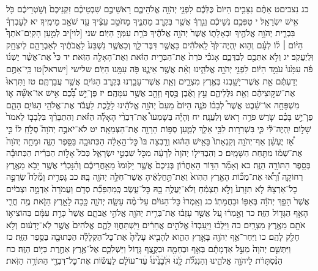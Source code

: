 \documentclass[twoside, openany, parskip=half, 11pt]{book}
\begin{document}
כג נִצביםט אַתֶּ֨ם נִצָּבִ֤ים הַיּוֹם֙ כֻּלְּכֶ֔ם לִפְנֵ֖י יְהֹוָ֣ה אֱלֹהֵיכֶ֑ם רָאשֵׁיכֶ֣ם שִׁבְטֵיכֶ֗ם זִקְנֵיכֶם֙ וְשֹׁ֣טְרֵיכֶ֔ם כֹּ֖ל אִ֥ישׁ יִשְׂרָאֵֽל׃ י טַפְּכֶ֣ם נְשֵׁיכֶ֔ם וְגֵ֣רְךָ֔ אֲשֶׁ֖ר בְּקֶ֣רֶב מַחֲנֶ֑יךָ מֵחֹטֵ֣ב עֵצֶ֔יךָ עַ֖ד שֹׁאֵ֥ב מֵימֶֽיךָ׃ יא לְעׇבְרְךָ֗ בִּבְרִ֛ית יְהֹוָ֥ה אֱלֹהֶ֖יךָ וּבְאָלָת֑וֹ אֲשֶׁר֙ יְהֹוָ֣ה אֱלֹהֶ֔יךָ כֹּרֵ֥ת עִמְּךָ֖ הַיּֽוֹם׃ שני [לוי]יב לְמַ֣עַן הָקִֽים־אֹתְךָ֩ הַיּ֨וֹם ׀ ל֜וֹ לְעָ֗ם וְה֤וּא יִֽהְיֶה־לְּךָ֙ לֵֽאלֹהִ֔ים כַּאֲשֶׁ֖ר דִּבֶּר־לָ֑ךְ וְכַאֲשֶׁ֤ר נִשְׁבַּע֙ לַאֲבֹתֶ֔יךָ לְאַבְרָהָ֥ם לְיִצְחָ֖ק וּֽלְיַעֲקֹֽב׃ יג וְלֹ֥א אִתְּכֶ֖ם לְבַדְּכֶ֑ם אָנֹכִ֗י כֹּרֵת֙ אֶת־הַבְּרִ֣ית הַזֹּ֔את וְאֶת־הָאָלָ֖ה הַזֹּֽאת׃ יד כִּי֩ אֶת־אֲשֶׁ֨ר יֶשְׁנ֜וֹ פֹּ֗ה עִמָּ֙נוּ֙ עֹמֵ֣ד הַיּ֔וֹם לִפְנֵ֖י יְהֹוָ֣ה אֱלֹהֵ֑ינוּ וְאֵ֨ת אֲשֶׁ֥ר אֵינֶ֛נּוּ פֹּ֖ה עִמָּ֥נוּ הַיּֽוֹם׃ שלישי [ישראל]טו כִּֽי־אַתֶּ֣ם יְדַעְתֶּ֔ם אֵ֥ת אֲשֶׁר־יָשַׁ֖בְנוּ בְּאֶ֣רֶץ מִצְרָ֑יִם וְאֵ֧ת אֲשֶׁר־עָבַ֛רְנוּ בְּקֶ֥רֶב הַגּוֹיִ֖ם אֲשֶׁ֥ר עֲבַרְתֶּֽם׃ טז וַתִּרְאוּ֙ אֶת־שִׁקּ֣וּצֵיהֶ֔ם וְאֵ֖ת גִּלֻּלֵיהֶ֑ם עֵ֣ץ וָאֶ֔בֶן כֶּ֥סֶף וְזָהָ֖ב אֲשֶׁ֥ר עִמָּהֶֽם׃ יז פֶּן־יֵ֣שׁ בָּ֠כֶ֠ם אִ֣ישׁ אוֹ־אִשָּׁ֞ה א֧וֹ מִשְׁפָּחָ֣ה אוֹ־שֵׁ֗בֶט אֲשֶׁר֩ לְבָב֨וֹ פֹנֶ֤ה הַיּוֹם֙ מֵעִם֙ יְהֹוָ֣ה אֱלֹהֵ֔ינוּ לָלֶ֣כֶת לַעֲבֹ֔ד אֶת־אֱלֹהֵ֖י הַגּוֹיִ֣ם הָהֵ֑ם פֶּן־יֵ֣שׁ בָּכֶ֗ם שֹׁ֛רֶשׁ פֹּרֶ֥ה רֹ֖אשׁ וְלַעֲנָֽה׃ יח וְהָיָ֡ה בְּשׇׁמְעוֹ֩ אֶת־דִּבְרֵ֨י הָאָלָ֜ה הַזֹּ֗את וְהִתְבָּרֵ֨ךְ בִּלְבָב֤וֹ לֵאמֹר֙ שָׁל֣וֹם יִֽהְיֶה־לִּ֔י כִּ֛י בִּשְׁרִר֥וּת לִבִּ֖י אֵלֵ֑ךְ לְמַ֛עַן סְפ֥וֹת הָרָוָ֖ה אֶת־הַצְּמֵאָֽה׃ יט לֹא־יֹאבֶ֣ה יְהֹוָה֮ סְלֹ֣חַֽ לוֹ֒ כִּ֣י אָ֠ז יֶעְשַׁ֨ן אַף־יְהֹוָ֤ה וְקִנְאָתוֹ֙ בָּאִ֣ישׁ הַה֔וּא וְרָ֤בְצָה בּוֹ֙ כׇּל־הָ֣אָלָ֔ה הַכְּתוּבָ֖ה בַּסֵּ֣פֶר הַזֶּ֑ה וּמָחָ֤ה יְהֹוָה֙ אֶת־שְׁמ֔וֹ מִתַּ֖חַת הַשָּׁמָֽיִם׃ כ וְהִבְדִּיל֤וֹ יְהֹוָה֙ לְרָעָ֔ה מִכֹּ֖ל שִׁבְטֵ֣י יִשְׂרָאֵ֑ל כְּכֹל֙ אָל֣וֹת הַבְּרִ֔ית הַכְּתוּבָ֕ה בְּסֵ֥פֶר הַתּוֹרָ֖ה הַזֶּֽה׃ כא וְאָמַ֞ר הַדּ֣וֹר הָאַחֲר֗וֹן בְּנֵיכֶם֙ אֲשֶׁ֤ר יָק֙וּמוּ֙ מֵאַ֣חֲרֵיכֶ֔ם וְהַ֨נׇּכְרִ֔י אֲשֶׁ֥ר יָבֹ֖א מֵאֶ֣רֶץ רְחוֹקָ֑ה וְ֠רָא֠וּ אֶת־מַכּ֞וֹת הָאָ֤רֶץ הַהִוא֙ וְאֶת־תַּ֣חֲלֻאֶ֔יהָ אֲשֶׁר־חִלָּ֥ה יְהֹוָ֖ה בָּֽהּ׃ כב גׇּפְרִ֣ית וָמֶ֘לַח֮ שְׂרֵפָ֣ה כׇל־אַרְצָהּ֒ לֹ֤א תִזָּרַע֙ וְלֹ֣א תַצְמִ֔חַ וְלֹא־יַעֲלֶ֥ה בָ֖הּ כׇּל־עֵ֑שֶׂב כְּֽמַהְפֵּכַ֞ת סְדֹ֤ם וַעֲמֹרָה֙ אַדְמָ֣ה וּצְבֹיִ֔ים אֲשֶׁר֙ הָפַ֣ךְ יְהֹוָ֔ה בְּאַפּ֖וֹ וּבַחֲמָתֽוֹ׃ כג וְאָֽמְרוּ֙ כׇּל־הַגּוֹיִ֔ם עַל־מֶ֨ה עָשָׂ֧ה יְהֹוָ֛ה כָּ֖כָה לָאָ֣רֶץ הַזֹּ֑את מֶ֥ה חֳרִ֛י הָאַ֥ף הַגָּד֖וֹל הַזֶּֽה׃ כד וְאָ֣מְר֔וּ עַ֚ל אֲשֶׁ֣ר עָזְב֔וּ אֶת־בְּרִ֥ית יְהֹוָ֖ה אֱלֹהֵ֣י אֲבֹתָ֑ם אֲשֶׁר֙ כָּרַ֣ת עִמָּ֔ם בְּהוֹצִיא֥וֹ אֹתָ֖ם מֵאֶ֥רֶץ מִצְרָֽיִם׃ כה וַיֵּלְכ֗וּ וַיַּֽעַבְדוּ֙ אֱלֹהִ֣ים אֲחֵרִ֔ים וַיִּֽשְׁתַּחֲו֖וּ לָהֶ֑ם אֱלֹהִים֙ אֲשֶׁ֣ר לֹֽא־יְדָע֔וּם וְלֹ֥א חָלַ֖ק לָהֶֽם׃ כו וַיִּחַר־אַ֥ף יְהֹוָ֖ה בָּאָ֣רֶץ הַהִ֑וא לְהָבִ֤יא עָלֶ֙יהָ֙ אֶת־כׇּל־הַקְּלָלָ֔ה הַכְּתוּבָ֖ה בַּסֵּ֥פֶר הַזֶּֽה׃ כז וַיִּתְּשֵׁ֤ם יְהֹוָה֙ מֵעַ֣ל אַדְמָתָ֔ם בְּאַ֥ף וּבְחֵמָ֖ה וּבְקֶ֣צֶף גָּד֑וֹל וַיַּשְׁלִכֵ֛ם אֶל־אֶ֥רֶץ אַחֶ֖רֶת כַּיּ֥וֹם הַזֶּֽה׃ כח הַנִּ֨סְתָּרֹ֔ת לַיהֹוָ֖ה אֱלֹהֵ֑ינוּ וְהַנִּגְלֹ֞ת לָ֤ׄנׄוּׄ וּׄלְׄבָׄנֵׄ֙יׄנׄוּׄ֙ עַׄד־עוֹלָ֔ם לַעֲשׂ֕וֹת אֶת־כׇּל־דִּבְרֵ֖י הַתּוֹרָ֥ה הַזֹּֽאת׃
\end{document}
